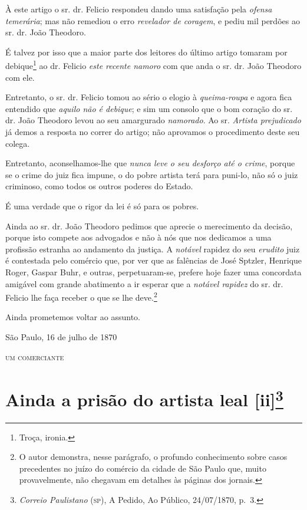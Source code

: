 À este artigo o sr. dr. Felicio respondeu dando uma satisfação pela
\emph{ofensa temerária}; mas não remediou o erro \emph{revelador de
coragem}, e pediu mil perdões ao sr. dr. João Theodoro.

É talvez por isso que a maior parte dos leitores do último artigo
tomaram por debique\footnote{ Troça, ironia.} ao dr. Felicio \emph{este
recente namoro} com que anda o sr. dr. João Theodoro com ele.

Entretanto, o sr. dr. Felicio tomou ao sério o elogio à
\emph{queima-roupa} e agora fica entendido que \emph{aquilo não é
debique}; e sim um consolo que o bom coração do sr. dr. João Theodoro
levou ao seu amargurado \emph{namorado}. Ao sr. \emph{Artista
prejudicado} já demos a resposta no correr do artigo; não aprovamos o
procedimento deste seu colega.

Entretanto, aconselhamos-lhe que \emph{nunca leve o seu desforço até o
crime}, porque se o crime do juiz fica impune, o do pobre artista terá
para puni-lo, não só o juiz criminoso, como todos os outros poderes do
Estado.

É uma verdade que o rigor da lei é só para os pobres.

Ainda ao sr. dr. João Theodoro pedimos que aprecie o merecimento da
decisão, porque isto compete aos advogados e não à nós que nos dedicamos
a uma profissão estranha ao andamento da justiça. A \emph{notável}
rapidez do seu \emph{erudito} juiz é contestada pelo comércio que, por
ver que as falências de José Sptzler, Henrique Roger, Gaspar Buhr, e
outras, perpetuaram-se, prefere hoje fazer uma concordata amigável com
grande abatimento a ir esperar que a \emph{notável rapidez} do sr. dr.
Felicio lhe faça receber o que se lhe deve.\footnote{ O autor
  demonstra, nesse parágrafo, o profundo conhecimento sobre casos
  precedentes no juízo do comércio da cidade de São Paulo que, muito
  provavelmente, não chegavam em detalhes às páginas dos jornais.}

Ainda prometemos voltar ao assunto.

\begin{flushright}
São Paulo, 16 de julho de 1870

\textsc{um comerciante}
\end{flushright}

\chapter{Ainda a prisão do artista leal {[}ii{]}\footnote{\emph{Correio Paulistano} (\textsc{sp}), A Pedido, Ao Público,
  24/07/1870, p.~3.}} %

